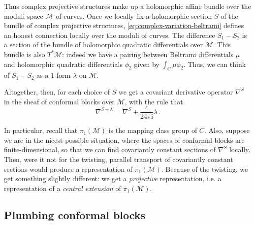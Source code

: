\documentclass[12pt,letterpaper,reqno]{amsart}
\numberwithin{equation}{section}
\newcommand{\cM}{\ensuremath{\mathcal M}}
\newcommand{\I}{{\mathrm i}}
\newcommand{\ti}[1]{\textit{#1}}
\DeclareRobustCommand{\fixme}[1]{\leavevmode{\color{orange}[#1]}}
\begin{document}
Thus complex projective structures make up a holomorphic affine bundle over the moduli space $\cM$ of curves.
Once we locally fix a holomorphic section $S$ 
of the bundle of 
complex projective structures, \eqref{eq:complex-variation-beltrami} defines an honest connection locally over the moduli of curves.
The difference $S_1 - S_2$ is a section
of the bundle of holomorphic quadratic differentials over $\cM$. 
This bundle is also $T^* \cM$: indeed we have a pairing between Beltrami differentials $\mu$ and holomorphic quadratic differentials
$\phi_2$ given by $\int_C \mu \phi_2$.
Thus, we can think of $S_1 - S_2$ as a $1$-form $\lambda$ on $\cM$.

Altogether, then, for each choice of $S$ we get a covariant derivative operator $\nabla^S$ in the sheaf of conformal blocks
over $\cM$, with the rule that
\begin{equation}
  \nabla^{S + \lambda} = \nabla^S + \frac{c}{24 \pi \I} \lambda \, .
\end{equation}
\fixme{calculate the curvature}


In particular, recall that $\pi_1(\cM)$ is the mapping class group of $C$. Also, suppose we are in the nicest possible 
situation, where the spaces of conformal blocks are finite-dimensional, so that we can find covariantly constant sections of $\nabla^S$ locally. 
Then, were it not for the twisting, parallel transport of covariantly constant sections would produce a representation of
$\pi_1(\cM)$. Because of the twisting, we get something slightly different: we get a \ti{projective} representation,
i.e. a representation of a \ti{central extension} of $\pi_1(\cM)$.

\subsection{Plumbing conformal blocks}
\end{document}
